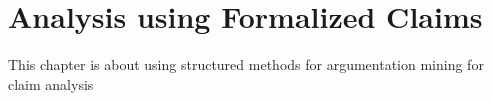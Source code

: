 \chapter{Analysis using Formalized Claims}

This chapter is about using structured methods for argumentation mining
for claim analysis \\
